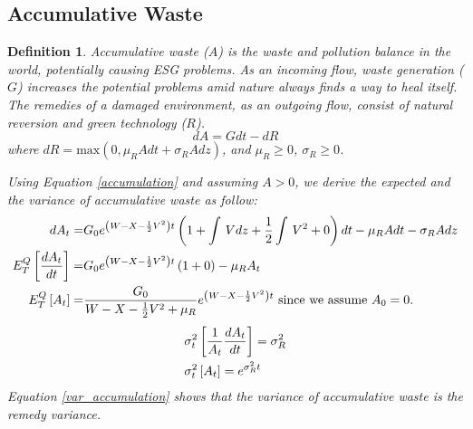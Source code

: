 \documentclass[sn-basic]{sn-jnl}%
\theoremstyle{thmstyleone}%
\theoremstyle{thmstyletwo}%
\theoremstyle{thmstylethree}%
\newtheorem{definition}{Definition}%
\begin{document}
\subsection{Accumulative Waste}
\begin{definition}
	\emph{Accumulative waste} ($A$) is the waste and pollution balance in the world, potentially causing ESG problems.  As an incoming flow, waste generation ($G$) increases the potential problems amid nature always finds a way to heal itself. The remedies of a damaged environment, as an outgoing flow, consist of natural reversion and green technology ($R$).
	\begin{equation} \label{accumulation}
		dA = G dt - dR
	\end{equation}
	where $dR= \text{max}\left(0,\mu_R A dt + \sigma_R A dz\right)$, and $\mu_R \geq 0$, $\sigma_R \geq 0$.
	
	Using Equation \ref{accumulation} and assuming $A > 0$, we derive the expected and the variance of accumulative waste as follow:
	\begin{align} \label{exp_accumulation}
		dA_t=&G_0e^{\left(W-X-\frac{1}{2}V^2\right)t}\left(1+\int\, Vdz+\frac{1}{2}\int\,V^2+0\right)dt-\mu_R A dt -\sigma_R A dz\notag\\
		E_T^Q\left[\frac{dA_t}{dt}\right]=&G_0e^{\left(W-X-\frac{1}{2}V^2\right)t}\left(1+0\right)-\mu_R A_t \notag\\
		E_T^Q\left[A_t\right]=&\frac{G_0}{W-X-\frac{1}{2}V^2+\mu_R}e^{\left(W-X-\frac{1}{2}V^2\right)t} \mbox{ since we assume $A_0=0$.}
	\end{align}
	\begin{align} \label{var_accumulation}
	&	\sigma_t^2\left[\frac{1}{A_t}\frac{dA_t}{dt}\right]=\sigma_R^2\notag\\
	&	\sigma_t^2\left[A_t\right]=e^{\sigma_R^2t}
	\end{align}
Equation \ref{var_accumulation} shows that the variance of accumulative waste is the remedy variance.


\end{definition}
\end{document}
